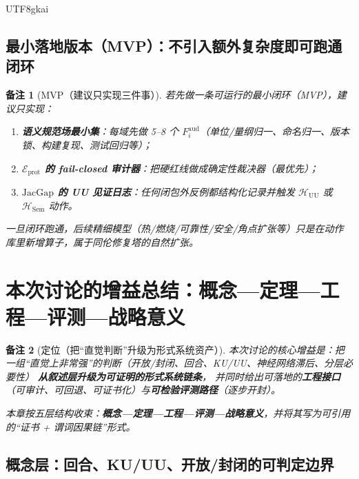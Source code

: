 \documentclass[12pt]{article}
\newtheorem{remark}{备注}[section]
\newcommand{\Homotopy}{\ensuremath{\mathcal{H}}}
\newcommand{\JacGap}{\ensuremath{\mathrm{JacGap}}} %
\begin{document}
\begin{CJK*}{UTF8}{gkai}
\subsection{最小落地版本（MVP）：不引入额外复杂度即可跑通闭环}
\label{sec:eng-minimal-mvp}

\begin{remark}[MVP（建议只实现三件事）]
若先做一条可运行的最小闭环（MVP），建议只实现：
\begin{enumerate}
  \item \textbf{语义规范场最小集}：每域先做 5--8 个 $F_i^{\mathrm{aud}}$（单位/量纲归一、命名归一、版本锁、构建复现、测试回归等）；
  \item \textbf{$\mathcal{E}_{\mathrm{prot}}$ 的 fail-closed 审计器}：把硬红线做成确定性裁决器（最优先）；
  \item \textbf{$\JacGap$ 的 UU 见证日志}：任何闭包外反例都结构化记录并触发 $\Homotopy_{\mathrm{UU}}$ 或 $\Homotopy_{\mathrm{Sem}}$ 动作。
\end{enumerate}
一旦闭环跑通，后续精细模型（热/燃烧/可靠性/安全/角点扩张等）只是在动作库里新增算子，属于同伦修复塔的自然扩张。
\end{remark}

\section{本次讨论的增益总结：概念—定理—工程—评测—战略意义}
\label{sec:discussion-gains-summary}

\begin{remark}[定位（把“直觉判断”升级为形式系统资产）]
本次讨论的核心增益是：把一组“直觉上非常强”的判断（开放/封闭、回合、KU/UU、神经网络滞后、分层必要性）
\textbf{从叙述层升级为可证明的形式系统链条}，
并同时给出可落地的\textbf{工程接口}（可审计、可回退、可证书化）与\textbf{可检验评测路径}（逐步开封）。

本章按五层结构收束：\textbf{概念—定理—工程—评测—战略意义}，并将其写为可引用的“证书 + 谓词因果链”形式。
\end{remark}

\subsection{概念层：回合、KU/UU、开放/封闭的可判定边界}
\label{sec:gains-concepts}


\end{CJK*}
\end{document}
